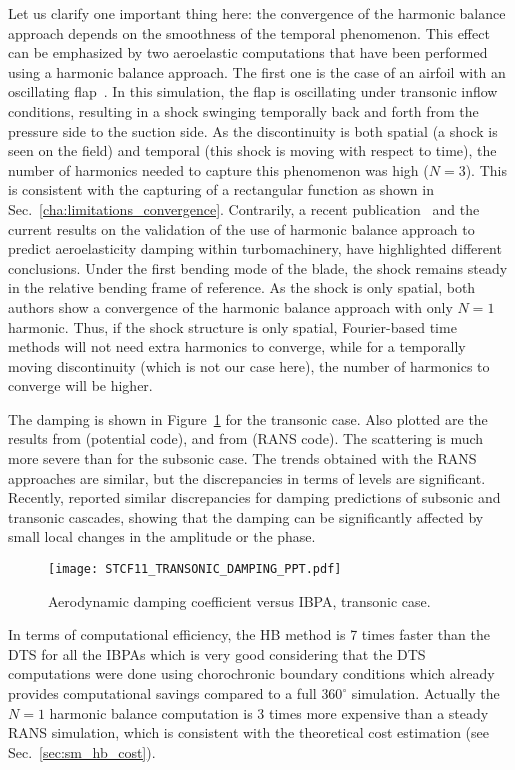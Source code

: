 Let us clarify one important thing here: 
the convergence of the harmonic balance approach depends
on the smoothness of the temporal phenomenon.
This effect can be emphasized by two 
aeroelastic computations that have been performed 
using a harmonic balance approach. 
The first one is the case of 
an airfoil with an oscillating 
flap~\cite{JDufour2009}. In this simulation, the flap is oscillating
under transonic inflow conditions, resulting in a shock swinging temporally
back and forth from the pressure side to the
suction side. As the discontinuity is
both spatial (a shock is seen on the field) and temporal
(this shock is moving with respect to time), the number
of harmonics needed to capture this phenomenon was high ($N=3$). This is
consistent with the capturing of a rectangular function
as shown in Sec.~\ref{cha:limitations_convergence}.
Contrarily, a recent publication~\cite{Huang2013a} and the
current results on the validation
of the use of harmonic balance approach to predict
aeroelasticity damping within turbomachinery, have highlighted
different conclusions. Under the first bending mode
of the blade, the shock remains steady in the relative bending frame
of reference. As the shock
is only spatial, both authors show a convergence of the
harmonic balance approach with only $N=1$ harmonic. Thus, if the shock
structure is only spatial, Fourier-based time methods will not need
extra harmonics to converge, while for a temporally moving discontinuity
(which is not our case here), the number
of harmonics to converge will be higher.

The damping is shown in Figure~\ref{fig:stcf11_transonic_damping} for
the transonic case. Also plotted are the results from
\citet{Fransson1999} (potential code), and 
from \citet{Cinnella2004} (RANS code). The scattering is much more severe
than for the subsonic case. The trends obtained with the RANS 
approaches are similar, but the discrepancies in terms of
levels are significant.
Recently, \citet{Vogt2011} reported similar discrepancies 
for damping predictions of subsonic and transonic cascades, 
showing that the damping can be significantly affected by 
small local changes in the amplitude or the phase.
\begin{figure}[htp]
  \centering
  \texttt{[image: STCF11\_TRANSONIC\_DAMPING\_PPT.pdf]}
  \caption{Aerodynamic damping coefficient versus IBPA, transonic case.}
  \label{fig:stcf11_transonic_damping}
\end{figure}

In terms of computational efficiency, the HB method is 7 times faster
than the DTS for all the IBPAs which is very good considering 
that the DTS computations
were done using chorochronic boundary conditions which already
provides computational savings compared to a
full $360^\circ$ simulation. Actually the $N=1$ harmonic
balance computation is 3 times more expensive than a
steady RANS simulation, which is consistent with the
theoretical cost estimation (see Sec.~\ref{sec:sm_hb_cost}).
